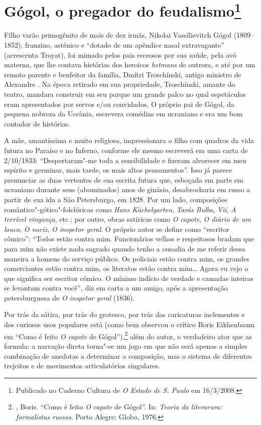\chapter{Gógol, o pregador do feudalismo\footnote{Publicado no Caderno Cultura de \emph{O Estado de S. Paulo} em 16/3/2008.}}

Filho varão primogênito de mais de dez irmãs, Nikolai Vassílievitch
Gógol (1809--1852), franzino, astênico e ``dotado de um apêndice nasal
extravagante'' (acrescenta Troyat), foi mimado pelos pais receosos por sua saúde, pela avó materna, que lhe contava histórias dos heroicos \emph{hetmans} de outrora, e até por um remoto parente e benfeitor da família, Dmítri Troschínski, antigo ministro de Alexandre . Na época retirado em sua propriedade, Troschínski, amante do teatro, mandara construir em seu parque um grande palco no qual espetáculos eram apresentados por servos e/ou convidados. O próprio pai de Gógol, da pequena nobreza da Ucrânia, escrevera comédias em ucraniano e era um bom contador de histórias.

A mãe, amantíssima e muito religiosa, impressionara o filho com quadros da vida futura no Paraíso e no Inferno, conforme ele mesmo escreverá em uma carta de 2/10/1833: ``Despertaram"-me toda a sensibilidade e fizeram alvorecer em meu espírito e germinar, mais tarde, os mais altos pensamentos''. Isso já parece prenunciar as duas vertentes de sua escrita futura que, esboçada em parte em ucraniano durante seus (abominados) anos de ginásio, desabrocharia em russo a partir de sua ida a São Petersburgo, em 1828. Por um lado, composições romântico"-gótico"-folclóricas como \emph{Hans Küchelgarten}, \emph{Tarás Bulba}, \emph{Vii}, \emph{A terrível vingança}, etc.; por outro, obras satíricas como \emph{O capote}, \emph{O diário de um louco}, \emph{O nariz}, \emph{O inspetor geral}. O próprio autor se define como ``escritor cômico'': ``Todos estão contra mim. Funcionários velhos e respeitosos bradam que para mim não existe nada sagrado quando tenho a ousadia de me referir dessa maneira a homens do serviço público. Os policiais estão contra mim, os grandes comerciantes estão contra mim, os literatos estão contra mim\ldots{} Agora eu vejo o que significa ser escritor cômico. O mínimo indício de verdade e camadas inteiras se levantam contra você'', diz em
carta a um amigo, após a apresentação petersburguesa de \emph{O inspetor geral} (1836).

Por trás da sátira, por trás do grotesco, por trás das caricaturas
inclementes e dos curiosos usos populares está (como bem observou o crítico Boris Eikhenbaum em ``Como é feito \emph{O capote} de Gógol''),\footnote{, Boris. ``Como é feito \emph{O capote} de Gógol''. In: \emph{Teoria da literarura: formalistas russos}. Porto Alegre: Globo, 1976.} além do autor, o verdadeiro ator que as formula: a narração direta torna"-se um jogo em que não será apenas a simples combinação de anedotas a determinar a composição, mas o sistema de diferentes trejeitos e de movimentos articulatórios singulares. 

